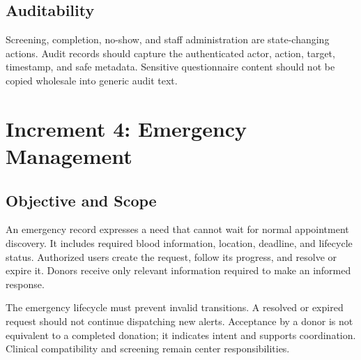 
\subsection{Auditability}
Screening, completion, no-show, and staff administration are state-changing actions. Audit records should capture the authenticated actor, action, target, timestamp, and safe metadata. Sensitive questionnaire content should not be copied wholesale into generic audit text.

\section{Increment 4: Emergency Management}
\subsection{Objective and Scope}
An emergency record expresses a need that cannot wait for normal appointment discovery. It includes required blood information, location, deadline, and lifecycle status. Authorized users create the request, follow its progress, and resolve or expire it. Donors receive only relevant information required to make an informed response.


The emergency lifecycle must prevent invalid transitions. A resolved or expired request should not continue dispatching new alerts. Acceptance by a donor is not equivalent to a completed donation; it indicates intent and supports coordination. Clinical compatibility and screening remain center responsibilities.


